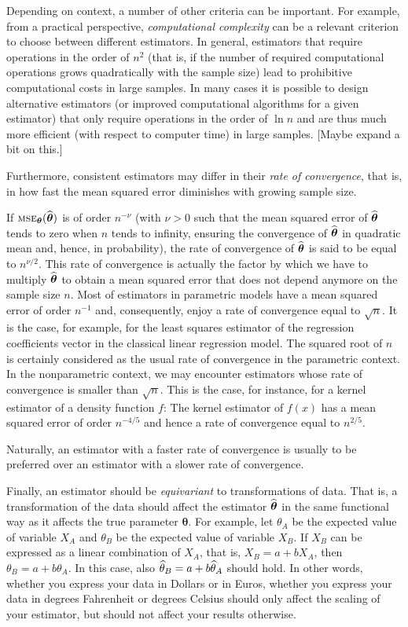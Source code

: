 Depending on context, a number of other criteria can be important. For example,
from a practical perspective, \emph{computational complexity} can be a relevant
criterion to choose between different estimators. In general, estimators that
require operations in the order of $n^2$ (that is, if the number of required
computational operations grows quadratically with the sample size) lead to
prohibitive computational costs in large samples. In many cases it is possible
to design alternative estimators (or improved computational algorithms
for a given estimator) that only require operations in the order of $\ln n$ and
are thus much more efficient (with respect to computer time) in large samples.
\alert{[Maybe expand a bit on this.]}

Furthermore, consistent estimators may differ in their \emph{rate of
convergence}, that is, in how fast the mean squared error diminishes with
growing sample size. 

If $\stsc{MSE}_{\boldsymbol\theta}(\sthat{\boldsymbol\theta})$ is of order
$n^{-\nu}$ (with $\nu > 0$ such that the mean squared error of
$\widehat{\boldsymbol\theta}$ tends to zero when $n$ tends to infinity, ensuring
the convergence of $\widehat{\boldsymbol\theta}$ in quadratic mean and, hence, in
probability), the rate of convergence of $\widehat{\boldsymbol\theta}$ is said to
be equal to $n^{\nu/2}$. This rate of convergence is actually the factor by
which we have to multiply $\widehat{\boldsymbol\theta}$ to obtain a mean squared
error that does not depend anymore on the sample size $n$. Most of estimators
in parametric models have a mean squared error of order $n^{-1}$ and,
consequently, enjoy a rate of convergence equal to $\sqrt{n}$. It is the case,
for example, for the least squares estimator of the regression coefficients
vector in the classical linear regression model. The squared root of $n$ is
certainly considered as the usual rate of convergence in the parametric
context. In the nonparametric context, we may encounter estimators whose rate
of convergence is smaller than $\sqrt{n}$. This is the case, for instance, for
a kernel estimator of a density function $f$: The kernel estimator of $f(x)$
has a mean squared error of order $n^{-4/5}$ and hence a rate of convergence
equal to $n^{2/5}$.

Naturally, an estimator with a faster rate of convergence is usually to be
preferred over an estimator with a slower rate of convergence.

Finally, an estimator should be \emph{equivariant} to transformations of data.
That is, a transformation of the data should affect the estimator
$\widehat{\boldsymbol\theta}$ in the same functional way as it affects the true
parameter $\boldsymbol\theta$. For example, let $\theta_A$ be the expected
value of variable $X_A$ and $\theta_B$ be the expected value of variable $X_B$.
If $X_B$ can be expressed as a linear combination of $X_A$, that is, $X_B = a +
b X_A$, then $\theta_B = a + b \theta_A$. In this case, also
$\widehat{\theta}_B = a + b \widehat{\theta}_A$ should hold. In other words,
whether you express your data in Dollars or in Euros, whether you express your
data in degrees Fahrenheit or degrees Celsius should only affect the scaling of
your estimator, but should not affect your results otherwise.


